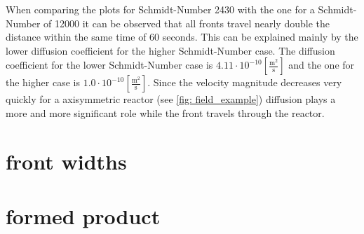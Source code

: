 \documentclass[../thesis.tex]{subfiles}
\begin{document}
When comparing the plots for Schmidt-Number 2430 with the one for a Schmidt-Number of 12000 it can be observed that all fronts travel nearly double the distance within the same time of 60 seconds. This can be explained mainly by the lower diffusion coefficient for the higher Schmidt-Number case. The diffusion coefficient for the lower Schmidt-Number case is $4 \text{.}11 \cdot 10^{-10} \left[ \frac{\mathrm{m^2}}{\mathrm{s}} \right]$ and the one for the higher case is $1\text{.}0 \cdot 10^{-10} \left[ \frac{\mathrm{m^2}}{\mathrm{s}} \right]$.
Since the velocity magnitude decreases very quickly for a axisymmetric reactor (see \autoref{fig: field_example}) diffusion plays a more and more significant role while the front travels through the reactor.
\section{front widths}

\section{formed product}
\end{document}
